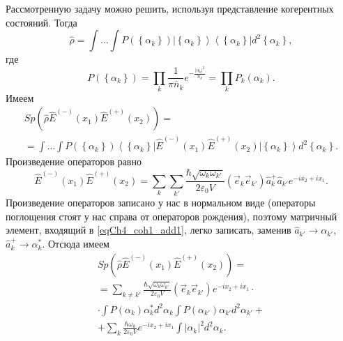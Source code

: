 Рассмотренную задачу можно решить, используя представление когерентных
состояний. Тогда
\begin{equation}
\hat{\rho} = \int \dots \int P\left(\left\{\alpha_k\right\}\right)
\left|\left\{\alpha_k\right\}\right>\left<\left\{\alpha_k\right\}\right|d^2 \left\{\alpha_k\right\},
\nonumber
\end{equation}
где
\begin{equation}
P\left(\left\{\alpha_k\right\}\right) = \prod_k\frac{1}{\pi
  \bar{n}_k}e^{-\frac{\left|\alpha_k\right|^2}{\bar{n}_k}}=
\prod_k P_k\left(\alpha_k\right).
\nonumber
\end{equation}
Имеем
\begin{eqnarray}
Sp \left(
\hat{\rho}\hat{E}^{(-)}\left(x_1\right)
\hat{E}^{(+)}\left(x_2\right)
\right) = 
\nonumber \\
= \int \dots \int
P\left(\left\{\alpha_k\right\}\right)
\left<\left\{\alpha_k\right\}\right|
\hat{E}^{(-)}\left(x_1\right)
\hat{E}^{(+)}\left(x_2\right)
\left|\left\{\alpha_k\right\}\right>
d^2 \left\{\alpha_k\right\}.
\label{eqCh4_coh1_add1}
\end{eqnarray}
Произведение операторов равно
\begin{equation}
\hat{E}^{(-)}\left(x_1\right)
\hat{E}^{(+)}\left(x_2\right) = 
\sum_k \sum_{k'}
\frac{\hbar\sqrt{\omega_{k}\omega_{k'}}}{2 \varepsilon_0 V}
\left(\vec{e}_{k}\vec{e}_{k'}\right)\hat{a}^{+}_{k}\hat{a}_{k'}
e^{-i x_2 + i x_1}.
\nonumber
\end{equation}
Произведение операторов записано у нас в нормальном виде (операторы
поглощения стоят у нас справа от операторов рождения), поэтому
матричный элемент, входящий в \eqref{eqCh4_coh1_add1}, легко записать,
заменив $\hat{a}_{k'} \rightarrow \alpha_{k'}$, $\hat{a}^{+}_{k}
\rightarrow \alpha^{*}_{k}$. Отсюда имеем
\begin{eqnarray}
Sp \left(
\hat{\rho}\hat{E}^{(-)}\left(x_1\right)
\hat{E}^{(+)}\left(x_2\right)
\right) = 
\nonumber \\
= 
\sum_{k \ne k'}
\frac{\hbar\sqrt{\omega_{k}\omega_{k'}}}{2 \varepsilon_0 V}
\left(\vec{e}_{k}\vec{e}_{k'}\right)
e^{-i x_2 + i x_1}
\cdot
\nonumber \\
\cdot
\int 
P\left(\alpha_{k}\right)
\alpha^{*}_{k}
d^2 \alpha_{k} 
\int 
P\left(\alpha_{k'}\right)
\alpha_{k'}
d^2 \alpha_{k'} +
\nonumber \\
+
\sum_k 
\frac{\hbar\omega_{k}}{2 \varepsilon_0 V}
e^{-i x_2 + i x_1}
\int 
\left|
\alpha_{k}
\right|^2
d^2 \alpha_{k}.
\label{eqCh4_coh1_add2}
\end{eqnarray}
